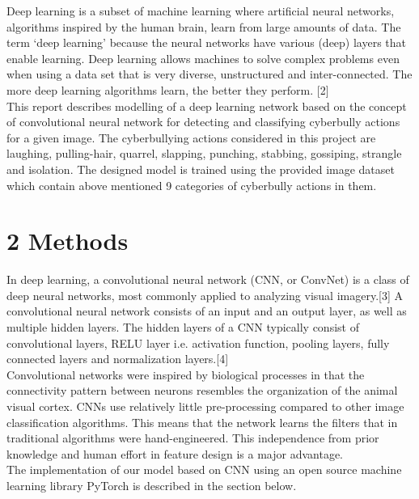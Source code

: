 \documentclass[12pt]{report}
\begin{document}
Deep learning is a subset of machine learning where artificial neural networks, algorithms inspired by the human brain, learn from large amounts of data. The term  ‘deep learning’ because the neural networks have various (deep) layers that enable learning. Deep learning allows machines to solve complex problems even when using a data set that is very diverse, unstructured and inter-connected. The more deep learning algorithms learn, the better they perform. [2] \\

This report describes modelling of a deep learning network based on the concept of convolutional neural network for detecting and classifying cyberbully actions for a given image. The cyberbullying actions considered in this project are laughing, pulling-hair, quarrel, slapping, punching, stabbing, gossiping, strangle and isolation. The designed model is trained using the provided image dataset which contain above mentioned 9 categories of cyberbully actions in them.   

\newpage

\section*{2 Methods}
In deep learning, a convolutional neural network (CNN, or ConvNet) is a class of deep neural networks, most commonly applied to analyzing visual imagery.[3] A convolutional neural network consists of an input and an output layer, as well as multiple hidden layers. The hidden layers of a CNN typically consist of convolutional layers, RELU layer i.e. activation function, pooling layers, fully connected layers and normalization layers.[4] \\ 

Convolutional networks were inspired by biological processes in that the connectivity pattern between neurons resembles the organization of the animal visual cortex. CNNs use relatively little pre-processing compared to other image classification algorithms. This means that the network learns the filters that in traditional algorithms were hand-engineered. This independence from prior knowledge and human effort in feature design is a major advantage. \\

The implementation of our model based on CNN using an open source machine learning library PyTorch is described in the section below. 
\end{document}
